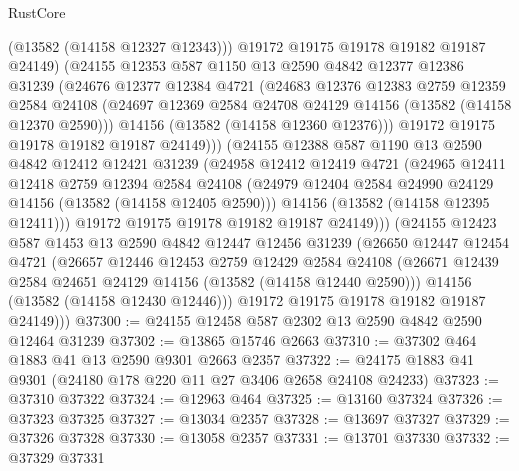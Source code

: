 \begin{lexlean}{RustCore}
\begin{coremodule}
              (@13582 (@14158 @12327 @12343)))
            @19172
            @19175
            @19178
            @19182
            @19187
            @24149)
          (@24155
            @12353
            @587
            @1150
            @13
            @2590
            @4842
            @12377
            @12386
            @31239
            (@24676
              @12377
              @12384
              @4721
              (@24683
                @12376
                @12383
                @2759
                @12359
                @2584
                @24108
                (@24697 @12369 @2584 @24708 @24129 @14156 (@13582 (@14158 @12370 @2590)))
                @14156
                (@13582 (@14158 @12360 @12376)))
              @19172
              @19175
              @19178
              @19182
              @19187
              @24149)))
        (@24155
          @12388
          @587
          @1190
          @13
          @2590
          @4842
          @12412
          @12421
          @31239
          (@24958
            @12412
            @12419
            @4721
            (@24965
              @12411
              @12418
              @2759
              @12394
              @2584
              @24108
              (@24979 @12404 @2584 @24990 @24129 @14156 (@13582 (@14158 @12405 @2590)))
              @14156
              (@13582 (@14158 @12395 @12411)))
            @19172
            @19175
            @19178
            @19182
            @19187
            @24149)))
      (@24155
        @12423
        @587
        @1453
        @13
        @2590
        @4842
        @12447
        @12456
        @31239
        (@26650
          @12447
          @12454
          @4721
          (@26657
            @12446
            @12453
            @2759
            @12429
            @2584
            @24108
            (@26671 @12439 @2584 @24651 @24129 @14156 (@13582 (@14158 @12440 @2590)))
            @14156
            (@13582 (@14158 @12430 @12446)))
          @19172
          @19175
          @19178
          @19182
          @19187
          @24149)))
@37300 := @24155 @12458 @587 @2302 @13 @2590 @4842 @2590 @12464 @31239
@37302 := @13865 @15746 @2663
@37310 := @37302 @464 @1883 @41 @13 @2590 @9301 @2663 @2357
@37322 := @24175 @1883 @41 @9301 (@24180 @178 @220 @11 @27 @3406 @2658 @24108 @24233)
@37323 := @37310 @37322
@37324 := @12963 @464
@37325 := @13160 @37324
@37326 := @37323 @37325
@37327 := @13034 @2357
@37328 := @13697 @37327
@37329 := @37326 @37328
@37330 := @13058 @2357
@37331 := @13701 @37330
@37332 := @37329 @37331

\end{coremodule}
\end{lexlean}
